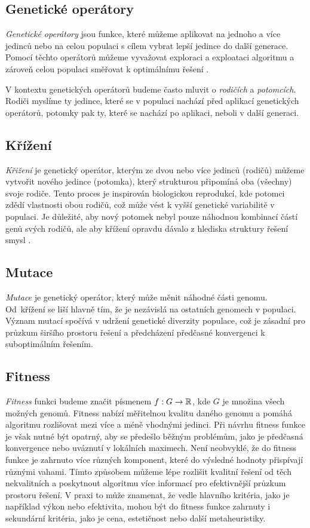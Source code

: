 \subsection{Genetické operátory}
\emph{Genetické operátory} jsou funkce, které můžeme aplikovat na jednoho a více jedinců nebo na celou populaci s cílem vybrat lepší jedince do další generace. Pomocí těchto operátorů můžeme vyvažovat exploraci a exploataci algoritmu a zároveň celou populaci směřovat k optimálnímu řešení \cite{EibenSmith2015}.

V kontextu genetických operátorů budeme často mluvit o \emph{rodičích} a \emph{potomcích}. Rodiči myslíme ty jedince, které se v populaci nachází před aplikací genetických operátorů, potomky pak ty, které se nachází po aplikaci, neboli v další generaci. 

\subsection{Křížení}
\emph{Křižení} je genetický operátor, kterým ze dvou nebo více jedinců (rodičů) můžeme vytvořit nového jedince (potomka), který strukturou připomíná oba (všechny) svoje rodiče. Tento proces je inspirován biologickou reprodukcí, kde potomci zdědí vlastnosti obou rodičů, což může vést k vyšší genetické variabilitě v populaci. Je důležité, aby nový potomek nebyl pouze náhodnou kombinací částí genů svých rodičů, ale aby křížení opravdu dávalo z hlediska struktury řešení smysl \cite{Jones1995Crossover}.

\subsection{Mutace}
\emph{Mutace} je genetický operátor, který může měnit náhodné části genomu. Od~křížení se liší hlavně tím, že je nezávislá na ostatních genomech v populaci. Význam mutací spočívá v udržení genetické diverzity populace, což je zásadní pro průzkum širšího prostoru řešení a předcházení předčasné konvergenci k suboptimálním řešením.

\subsection{Fitness}
\emph{Fitness} funkci budeme značit písmenem $f: G \rightarrow \mathbb{R}$, kde $G$ je množina všech možných genomů. Fitness nabízí měřitelnou kvalitu daného genomu a pomáhá algoritmu rozlišovat mezi více a méně vhodnými jedinci. Při návrhu fitness funkce je však nutné být opatrný, aby se předešlo běžným problémům, jako je předčasná konvergence nebo uváznutí v lokálních maximech. Není neobvyklé, že do fitness funkce je zahrnuto více různých komponent, které do výsledné hodnoty přispívají různými vahami. Tímto způsobem můžeme lépe rozlišit kvalitní řešení od těch nekvalitních a poskytnout algoritmu více informací pro efektivnější průzkum prostoru řešení. V praxi to může znamenat, že vedle hlavního kritéria, jako je například výkon nebo efektivita, mohou být do fitness funkce zahrnuty i sekundární kritéria, jako je cena, estetičnost nebo další metaheuristiky.


